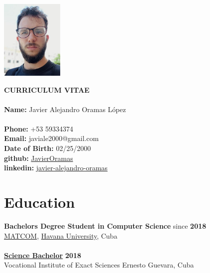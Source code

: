 \documentclass[a4paper,12pt]{article}
\begin{document}
\pagestyle{empty} %

\begin{center}
    \begin{minipage}[t]{0.2\textwidth}
        \vspace{0pt}
        \includegraphics[width=3cm]{img.png}
    \end{minipage}
    \hspace{1cm}
    \begin{minipage}[t]{0.7\textwidth}
        \vspace{0pt}
        \textbf{CURRICULUM VITAE}\\\\
        \textbf{Name:} Javier Alejandro Oramas López\\
        \\
        \textbf{Phone:} +53 59334374 \\
        \textbf{Email:} javiale2000@gmail.com \\
        \textbf{Date of Birth:}  02/25/2000\\
        \textbf{github:} \href{https://github.com/JavierOramas}{JavierOramas} \\
        \textbf{linkedin:} \href{https://www.linkedin.com/in/javier-alejandro-oramas-l%C3%B3pez-7ab47b160/}{javier-alejandro-oramas} \\
    \end{minipage}
\end{center}

\section*{Education}
\textbf{Bachelors Degree Student in Computer Science} \hfill since \textbf{2018}\\
\href{https://matcom.in/}{MATCOM}, \href{https://uh.cu}{Havana University}, Cuba\\
\vspace{0.1cm}\\
\textbf{\hyperref[sec:bachelor]{Science Bachelor}} \hfill \textbf{2018}\\
Vocational Institute of Exact Sciences Ernesto Guevara, Cuba
\end{document}
